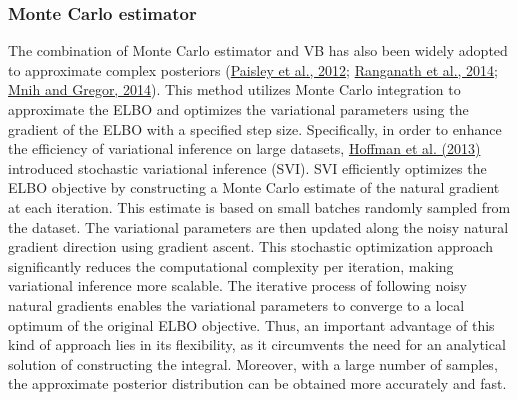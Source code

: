 \documentclass[12pt,a4paper]{article}
\begin{document}
\subsubsection{Monte Carlo estimator}
The combination of Monte Carlo estimator and VB has also been widely adopted to approximate complex posteriors (\hyperref[paisley2012]{Paisley et al., 2012}; \hyperref[ranganath2014]{Ranganath et al., 2014}; \hyperref[mnih2014]{Mnih and Gregor, 2014}). This method utilizes Monte Carlo integration to approximate the ELBO and optimizes the variational parameters using the gradient of the ELBO with a specified step size. Specifically, in order to enhance the efficiency of variational inference on large datasets, \hyperref[hoff2013]{Hoffman et al. (2013)} introduced stochastic variational inference (SVI). SVI efficiently optimizes the ELBO objective by constructing a Monte Carlo estimate of the natural gradient at each iteration. This estimate is based on small batches randomly sampled from the dataset. The variational parameters are then updated along the noisy natural gradient direction using gradient ascent. This stochastic optimization approach significantly reduces the computational complexity per iteration, making variational inference more scalable. The iterative process of following noisy natural gradients enables the variational parameters to converge to a local optimum of the original ELBO objective. Thus, an important advantage of this kind of approach lies in its flexibility, as it circumvents the need for an analytical solution of constructing the integral. Moreover, with a large number of samples, the approximate posterior distribution can be obtained more accurately and fast. 
\end{document}
